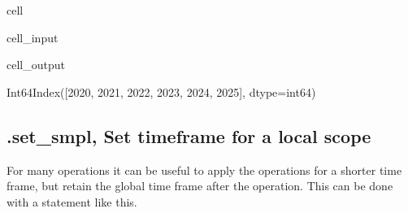 \documentclass[letterpaper,10pt,english]{jupyterBook}
\begin{document}
\begin{sphinxuseclass}{cell}\begin{sphinxVerbatimInput}

\begin{sphinxuseclass}{cell_input}
\begin{sphinxVerbatim}[commandchars=\\\{\}]
\end{sphinxVerbatim}

\end{sphinxuseclass}\end{sphinxVerbatimInput}
\begin{sphinxVerbatimOutput}

\begin{sphinxuseclass}{cell_output}
\begin{sphinxVerbatim}[commandchars=\\\{\}]
Int64Index([2020, 2021, 2022, 2023, 2024, 2025], dtype=\PYGZsq{}int64\PYGZsq{})
\end{sphinxVerbatim}

\end{sphinxuseclass}\end{sphinxVerbatimOutput}

\end{sphinxuseclass}

\subsection{.set\_smpl, Set timeframe for a local scope}
\label{\detokenize{content/Python/modelflow_features:set-smpl-set-timeframe-for-a-local-scope}}
\sphinxAtStartPar
For many operations it can be useful to apply the operations for a shorter time frame, but retain the global time frame after the operation. 
This can be done  with a  statement like this.
\end{document}
